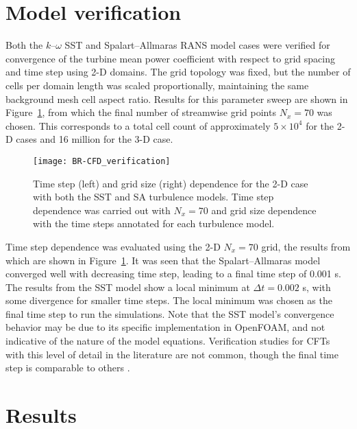 \section{Model verification}

Both the $k$--$\omega$ SST and Spalart--Allmaras RANS model cases were verified
for convergence of the turbine mean power coefficient with respect to grid
spacing and time step using 2-D domains. The grid topology was fixed, but the
number of cells per domain length was scaled proportionally, maintaining the
same background mesh cell aspect ratio. Results for this parameter sweep are
shown in Figure~\ref{fig:2d-br-verification}, from which the final number of
streamwise grid points $N_x = 70$ was chosen. This corresponds to a total cell
count of approximately $5 \times 10^4$ for the 2-D cases and 16 million for the
3-D case.

\begin{figure}
    \centering

    \texttt{[image: BR-CFD\_verification]}

    \caption{Time step (left) and grid size (right) dependence for the 2-D case
        with both the SST and SA turbulence models. Time step dependence was carried
        out with $N_x=70$ and grid size dependence with the time steps annotated for
        each turbulence model.}

    \label{fig:2d-br-verification}
\end{figure}

Time step dependence was evaluated using the 2-D $N_x=70$ grid, the results from
which are shown in Figure~\ref{fig:2d-br-verification}. It was seen that the
Spalart--Allmaras model converged well with decreasing time step, leading to a
final time step of 0.001 s. The results from the SST model show a local minimum
at $\Delta t = 0.002$ s, with some divergence for smaller time steps. The local
minimum was chosen as the final time step to run the simulations. Note that the
SST model's convergence behavior may be due to its specific implementation in
OpenFOAM, and not indicative of the nature of the model equations. Verification
studies for CFTs with this level of detail in the literature are not common,
though the final time step is comparable to others \cite{Balduzzi2016}.


\section{Results}

